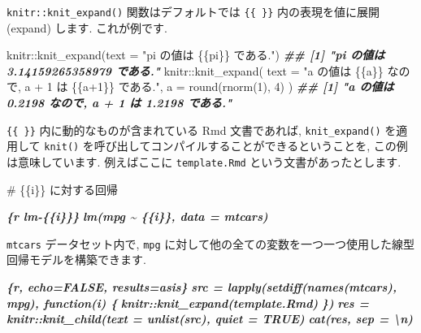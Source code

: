 \documentclass[
  11pt,
]{bxjsreport}
\newenvironment{Shaded}{\begin{snugshade}}{\end{snugshade}}
\newcommand{\AttributeTok}[1]{\textcolor[rgb]{0.77,0.63,0.00}{#1}}
\newcommand{\DecValTok}[1]{\textcolor[rgb]{0.00,0.00,0.81}{#1}}
\newcommand{\DocumentationTok}[1]{\textcolor[rgb]{0.56,0.35,0.01}{\textbf{\textit{#1}}}}
\newcommand{\FunctionTok}[1]{\textcolor[rgb]{0.00,0.00,0.00}{#1}}
\newcommand{\InformationTok}[1]{\textcolor[rgb]{0.56,0.35,0.01}{\textbf{\textit{#1}}}}
\newcommand{\NormalTok}[1]{#1}
\newcommand{\SpecialCharTok}[1]{\textcolor[rgb]{0.00,0.00,0.00}{#1}}
\newcommand{\StringTok}[1]{\textcolor[rgb]{0.31,0.60,0.02}{#1}}
\begin{document}
\texttt{knitr::knit\_expand()} 関数はデフォルトでは \texttt{\{\{ \}\}} 内の表現を値に展開 (expand) します. これが例です.

\begin{Shaded}
\begin{Highlighting}[numbers=left,,]
\NormalTok{knitr}\SpecialCharTok{::}\FunctionTok{knit\_expand}\NormalTok{(}\AttributeTok{text =} \StringTok{"\textasciigrave{}pi\textasciigrave{} の値は \{\{pi\}\} である."}\NormalTok{)}
\DocumentationTok{\#\# [1] "\textasciigrave{}pi\textasciigrave{} の値は 3.14159265358979 である."}
\NormalTok{knitr}\SpecialCharTok{::}\FunctionTok{knit\_expand}\NormalTok{(}
  \AttributeTok{text =} \StringTok{"\textasciigrave{}a\textasciigrave{} の値は \{\{a\}\} なので, \textasciigrave{}a + 1\textasciigrave{} は \{\{a+1\}\} である."}\NormalTok{,}
  \AttributeTok{a =} \FunctionTok{round}\NormalTok{(}\FunctionTok{rnorm}\NormalTok{(}\DecValTok{1}\NormalTok{), }\DecValTok{4}\NormalTok{)}
\NormalTok{)}
\DocumentationTok{\#\# [1] "\textasciigrave{}a\textasciigrave{} の値は 0.2198 なので, \textasciigrave{}a + 1\textasciigrave{} は 1.2198 である."}
\end{Highlighting}
\end{Shaded}

\texttt{\{\{ \}\}} 内に動的なものが含まれている Rmd 文書であれば, \texttt{knit\_expand()} を適用して \texttt{knit()} を呼び出してコンパイルすることができるということを, この例は意味しています. 例えばここに \texttt{template.Rmd} という文書があったとします.

\begin{Shaded}
\begin{Highlighting}[]
\FunctionTok{\# \{\{i\}\} に対する回帰}

\InformationTok{\textasciigrave{}\textasciigrave{}\textasciigrave{}\{r lm{-}\{\{i\}\}\}}
\InformationTok{lm(mpg \textasciitilde{} \{\{i\}\}, data = mtcars)}
\InformationTok{\textasciigrave{}\textasciigrave{}\textasciigrave{}}
\end{Highlighting}
\end{Shaded}

\texttt{mtcars} データセット内で, \texttt{mpg} に対して他の全ての変数を一つ一つ使用した線型回帰モデルを構築できます.

\begin{Shaded}
\begin{Highlighting}[]
\InformationTok{\textasciigrave{}\textasciigrave{}\textasciigrave{}\{r, echo=FALSE, results=\textquotesingle{}asis\textquotesingle{}\}}
\InformationTok{src = lapply(setdiff(names(mtcars), \textquotesingle{}mpg\textquotesingle{}), function(i) \{}
\InformationTok{  knitr::knit\_expand(\textquotesingle{}template.Rmd\textquotesingle{})}
\InformationTok{\})}
\InformationTok{res = knitr::knit\_child(text = unlist(src), quiet = TRUE)}
\InformationTok{cat(res, sep = \textquotesingle{}\textbackslash{}n\textquotesingle{})}
\InformationTok{\textasciigrave{}\textasciigrave{}\textasciigrave{}}
\end{Highlighting}
\end{Shaded}
\end{document}

